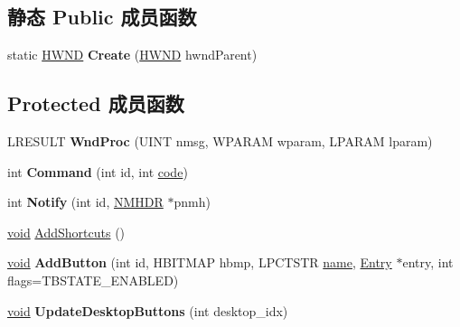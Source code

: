 \subsection*{静态 Public 成员函数}
\begin{DoxyCompactItemize}
\item 
\mbox{\label{struct_quick_launch_bar_a6dc4dc489dfef24d1017a994167b3334}} 
static \hyperlink{interfacevoid}{H\+W\+ND} {\bfseries Create} (\hyperlink{interfacevoid}{H\+W\+ND} hwnd\+Parent)
\end{DoxyCompactItemize}
\subsection*{Protected 成员函数}
\begin{DoxyCompactItemize}
\item 
\mbox{\label{struct_quick_launch_bar_aec8b0e7f1b73e243be859b05ca18adf6}} 
L\+R\+E\+S\+U\+LT {\bfseries Wnd\+Proc} (U\+I\+NT nmsg, W\+P\+A\+R\+AM wparam, L\+P\+A\+R\+AM lparam)
\item 
\mbox{\label{struct_quick_launch_bar_afbc520930909ea19f7b3fbed81f29f52}} 
int {\bfseries Command} (int id, int \hyperlink{structcode}{code})
\item 
\mbox{\label{struct_quick_launch_bar_aa1577519cc4e08342bcbba1b3319b639}} 
int {\bfseries Notify} (int id, \hyperlink{structtag_n_m_h_d_r}{N\+M\+H\+DR} $\ast$pnmh)
\item 
\hyperlink{interfacevoid}{void} \hyperlink{struct_quick_launch_bar_a47e0d543d791eb4069ef3133a146c3cb}{Add\+Shortcuts} ()
\item 
\mbox{\label{struct_quick_launch_bar_ae8dd225c35576c660c8b6a282ae2e49d}} 
\hyperlink{interfacevoid}{void} {\bfseries Add\+Button} (int id, H\+B\+I\+T\+M\+AP hbmp, L\+P\+C\+T\+S\+TR \hyperlink{structname}{name}, \hyperlink{struct_entry}{Entry} $\ast$entry, int flags=T\+B\+S\+T\+A\+T\+E\+\_\+\+E\+N\+A\+B\+L\+ED)
\item 
\mbox{\label{struct_quick_launch_bar_a89cbbcb3b5ed209f964c31db6230efde}} 
\hyperlink{interfacevoid}{void} {\bfseries Update\+Desktop\+Buttons} (int desktop\+\_\+idx)
\end{DoxyCompactItemize}
